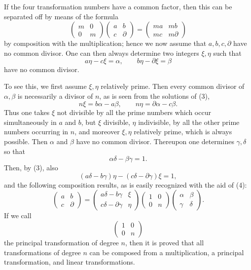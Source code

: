 \documentclass[11pt]{article}
\begin{document}
If the four transformation numbers have a common factor, then this can be separated off by means of the formula
\[
\begin{pmatrix}m&0\\0&m\end{pmatrix}
\begin{pmatrix}a&b\\c&\partial\end{pmatrix}
=\begin{pmatrix}ma&mb\\mc&m\partial\end{pmatrix}
\]
by composition with the multiplication; hence we now assume that $a,b,c,\partial$ have no common divisor. One can then always determine two integers $\xi,\eta$ such that
\begin{equation}
a\eta-c\xi=\alpha,
\qquad
b\eta-\partial\xi=\beta \tag{3}
\end{equation}
have no common divisor.

To see this, we first assume $\xi,\eta$ relatively prime. Then every common divisor of $\alpha,\beta$ is necessarily a divisor of $n$, as is seen from the solutions of (3),
\begin{equation}
n\xi=b\alpha-a\beta,
\qquad
n\eta=\partial\alpha-c\beta. \tag{4}
\end{equation}
Thus one takes $\xi$ not divisible by all the prime numbers which occur simultaneously in $a$ and $b$, but $\xi$ divisible, $\eta$ indivisible, by all the other prime numbers occurring in $n$, and moreover $\xi,\eta$ relatively prime, which is always possible. Then $\alpha$ and $\beta$ have no common divisor. Thereupon one determines $\gamma,\delta$ so that
\[
\alpha\delta-\beta\gamma=1.
\]
Then, by (3), also
\[
(a\delta-b\gamma)\eta-(c\delta-\partial\gamma)\xi=1,
\]
and the following composition results, as is easily recognized with the aid of (4):
\begin{equation}
\begin{pmatrix}a&b\\c&\partial\end{pmatrix}
=\begin{pmatrix}a\delta-b\gamma&\xi\\ c\delta-\partial\gamma&\eta\end{pmatrix}
\begin{pmatrix}1&0\\0&n\end{pmatrix}
\begin{pmatrix}\alpha&\beta\\\gamma&\delta\end{pmatrix}. \tag{5}
\end{equation}
If we call
\begin{equation}
\begin{pmatrix}1&0\\0&n\end{pmatrix} \tag{6}
\end{equation}
the principal transformation of degree $n$, then it is proved that all transformations of degree $n$ can be composed from a multiplication, a principal transformation, and linear transformations.
\end{document}
